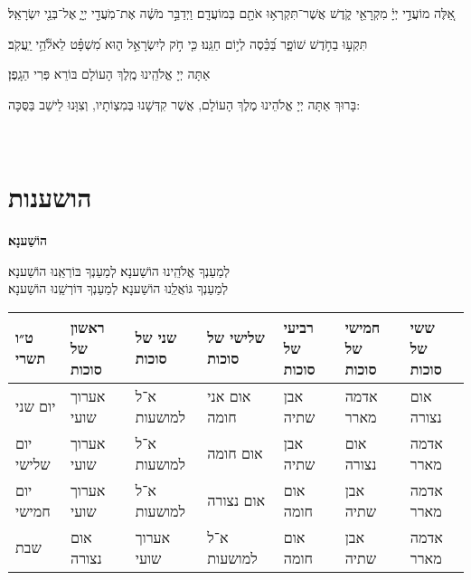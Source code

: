 \documentclass[twoside, openany, parskip=half, 11pt]{book}
\begin{document}
\sepline

  אֵ֚לֶּה מוֹעֲדֵ֣י יְיָ֔ מִקְרָאֵ֖י קֹ֑דֶשׁ אֲשֶׁר־תִּקְרְא֥וּ אֹתָ֖ם בְּמוֹעֲדָֽם׃ וַיְדַבֵּ֣ר מֹשֶׁ֔ה אֶת־מֹֽעֲדֵ֖י יְיָ֑ אֶל־בְּנֵ֖י יִשְׂרָאֵֽל׃

\sepline

  תִּקְע֣וּ בַחֹ֣דֶשׁ שׁוֹפָ֑ר בַּ֝כֵּ֗סֶה לְי֣וֹם חַגֵּֽנוּ׃ כִּ֤י חֹ֣ק לְיִשְׂרָאֵ֣ל ה֑וּא מִ֝שְׁפָּ֗ט לֵאלֹ֘הֵ֥י יַֽעֲקֹֽב׃

\sepline


אַתָּה יְיָ אֱלֹהֵֽינוּ מֶֽלֶךְ הָעוֹלָם בּוֹרֵא פְּרִי הַגָֽפֶן׃

\sepline

\begin{small}בָּרוּךְ אַתָּה יְיָ אֱלֹהֵינוּ מֶלֶךְ הָעוֹלָם, אֲשֶׁר קִדְּשָׁנוּ בְּמִצְוֹתָיו, וְצִוָּנוּ לֵישֵׁב בַּסֻּכָּה:\end{small} \\

\chapter[הושענות]{ הושענות }
\label{hoshanos}


\begin{Large}
\textbf{
הוֹשַׁענָא׃
}
\end{Large}


לְמַעַנְךָ אֱלֹהֵֽינוּ הוֹשַׁענָא׃ לְמַעַנְךָ בּוֹרְאֵֽנוּ הוֹשַׁענָא׃\\
לְמַעַנְךָ גּוֹאֲלֵֽנוּ הוֹשַׁענָא׃ לְמַעַנְךָ דּוֹרְשֵֽׁנוּ הוֹשַׁענָא׃

\begin{tiny}
\begin{tabular}{>{\centering\arraybackslash}m{}||>{\centering\arraybackslash}m{}|>{\centering\arraybackslash}m{}|>{\centering\arraybackslash}m{}|>{\centering\arraybackslash}m{}|>{\centering\arraybackslash}m{}|>{\centering\arraybackslash}m{}}
ט״ו תשרי & ראשון של סוכות & שני של סוכות & שלישי של סוכות & רביעי של סוכות & חמישי של סוכות & ששי של סוכות \\
\hline \hline
יום שני & אערוך שועי & א־ל למושעות & אום אני חומה & אבן שתיה & אדמה מארר & אום נצורה\\ \hline
יום שלישי & אערוך שועי & א־ל למושעות & אום חומה & אבן שתיה & אום נצורה & אדמה מארר \\ \hline
יום חמישי & אערוך שועי & א־ל למושעות & אום נצורה & אום חומה & אבן שתיה & אדמה מארר\\ \hline
שבת & אום נצורה & אערוך שועי & א־ל למושעות & אום חומה & אבן שתיה & אדמה מארר
\end{tabular}

\end{tiny}
\end{document}
